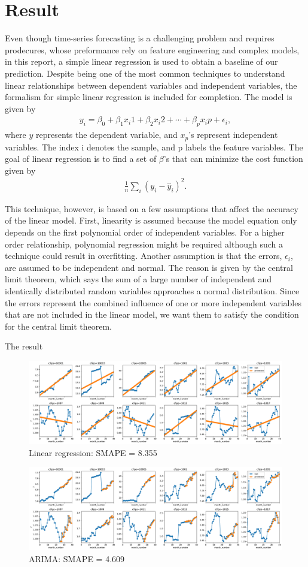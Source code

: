 \documentclass[prl,aps,superscriptaddress,twocolumn,10pt,nolongbibliography]{revtex4-2}
\begin{document}
\section{Result}
Even though time-series forecasting is a challenging problem and requires prodecures, whose preformance rely on feature engineering and complex models, in this report, a simple linear regression is used to obtain a baseline of our prediction. 
Despite being one of the most common techniques to understand linear relationships between dependent variables and independent variables, the formalism for simple linear regression is included for completion. 
The model is given by 
\begin{align}
y_i = \beta_0 + \beta_1 x_i1 + \beta_2 x_i2 + \cdots + \beta_p x_ip + \epsilon_i, 
\end{align}
where $y$ represents the dependent variable, and $x_p$'s represent independent variables. 
The index i denotes the sample, and p labels the feature variables. The goal of linear regression is to find a set of $\beta$'s that can minimize the cost function given by 
\begin{align}
\frac{1}{n} \sum_i (y_{i} - \hat{y}_{i})^2.
\end{align}

This technique, however, is based on a few assumptions that affect the accuracy of the linear model. 
First, linearity is assumed because the model equation only depends on the first polynomial order of independent variables. 
For a higher order relationship, polynomial regression might be required although such a technique could result in overfitting. 
Another assumption is that the errors, $\epsilon_i$, are assumed to be independent and normal. 
The reason is given by the central limit theorem, which says the sum of a large number of independent and identically distributed random variables approaches a normal distribution. 
Since the errors represent the combined influence of one or more independent variables that are not included in the linear model, we want them to satisfy the condition for the central limit theorem. 
  

The result 
\begin{figure}
\includegraphics[width=7in]{figs/linear.pdf}
\caption{\label{fig:}
Linear regression: SMAPE = 8.355
}
\end{figure}


\begin{figure}
\includegraphics[width=7in]{figs/arima.pdf}
\caption{\label{fig:arima}
ARIMA: SMAPE = 4.609
}
\end{figure}


{}
\end{document}
